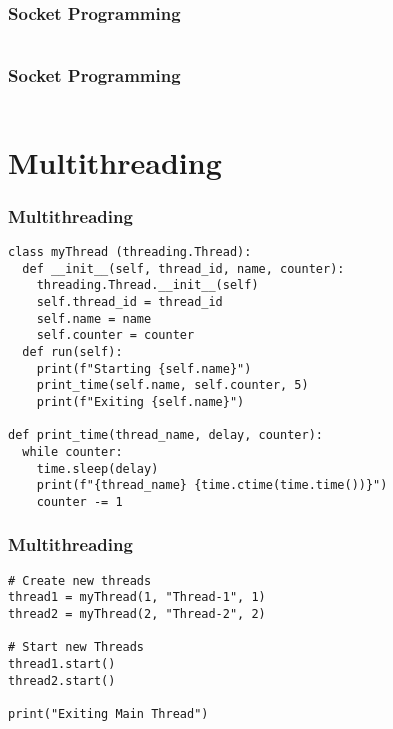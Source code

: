 \documentclass{../py-lecture}
\begin{document}
\begin{frame}[fragile]
	\frametitle{Socket Programming}
  \inputminted[bgcolor=Black,fontsize=\scriptsize]{python}{./src/server.py}
\end{frame}

\begin{frame}[fragile]
	\frametitle{Socket Programming}
  \inputminted[bgcolor=Black,fontsize=\scriptsize]{python}{./src/client.py}
\end{frame}

\section{Multithreading}

\begin{frame}[fragile]
	\frametitle{Multithreading}
  \begin{verbatim}
class myThread (threading.Thread):
  def __init__(self, thread_id, name, counter):
    threading.Thread.__init__(self)
    self.thread_id = thread_id
    self.name = name
    self.counter = counter
  def run(self):
    print(f"Starting {self.name}")
    print_time(self.name, self.counter, 5)
    print(f"Exiting {self.name}")

def print_time(thread_name, delay, counter):
  while counter:
    time.sleep(delay)
    print(f"{thread_name} {time.ctime(time.time())}")
    counter -= 1
  \end{verbatim}
\end{frame}

\begin{frame}[fragile]
	\frametitle{Multithreading}
  \begin{verbatim}
# Create new threads
thread1 = myThread(1, "Thread-1", 1)
thread2 = myThread(2, "Thread-2", 2)

# Start new Threads
thread1.start()
thread2.start()

print("Exiting Main Thread")
  \end{verbatim}
\end{frame}
\end{document}
